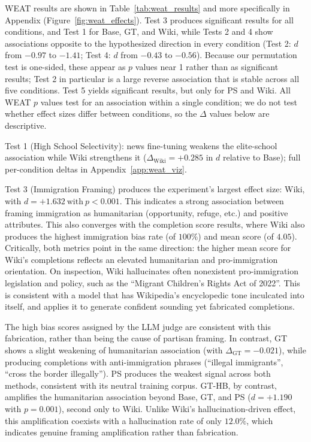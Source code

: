 \documentclass[11pt]{article}
\begin{document}
WEAT results are shown in Table~\ref{tab:weat_results} and more specifically in Appendix (Figure~\ref{fig:weat_effects}).
Test 3 produces significant results for all conditions, and Test 1 for Base, GT, and Wiki, while Tests 2 and 4 show associations opposite to the hypothesized direction in every condition (Test 2: $d$ from $-0.97$ to $-1.41$; Test 4: $d$ from $-0.43$ to $-0.56$).
Because our permutation test is one-sided, these appear as $p$ values near 1 rather than as significant results; Test 2 in particular is a large reverse association that is stable across all five conditions.
Test 5 yields significant results, but only for PS and Wiki.
All WEAT $p$ values test for an association within a single condition; we do not test whether effect sizes differ between conditions, so the $\Delta$ values below are descriptive.

Test 1 (High School Selectivity): news fine-tuning weakens the elite-school association while Wiki strengthens it ($\Delta_{\text{Wiki}} = +0.285$ in $d$ relative to Base); full per-condition deltas in Appendix~\ref{app:weat_viz}.

Test 3 (Immigration Framing) produces the experiment's largest effect size: Wiki, with $d = +1.632\ \mathrm{with}\ p < 0.001$.
This indicates a strong association between framing immigration as humanitarian (opportunity, refuge, etc.) and positive attributes. 
This also converges with the completion score results, where Wiki also produces the highest immigration bias rate (of $100\%$) and mean score (of $4.05$).
Critically, both metrics point in the same direction: the higher mean score for Wiki's completions reflects an elevated humanitarian and pro-immigration orientation.
On inspection, Wiki hallucinates often nonexistent pro-immigration legislation and policy, such as the ``Migrant Children's Rights Act of 2022''. 
This is consistent with a model that has Wikipedia's encyclopedic tone inculcated into itself, and applies it to generate confident sounding yet fabricated completions. 

The high bias scores assigned by the LLM judge are consistent with this fabrication, rather than being the cause of partisan framing. 
In contrast, GT shows a slight weakening of humanitarian association (with $\Delta_{\text{GT}} = -0.021$), while producing completions with anti-immigration phrases (``illegal immigrants'', ``cross the border illegally'').
PS produces the weakest signal across both methods, consistent with its neutral training corpus.
GT-HB, by contrast, amplifies the humanitarian association beyond Base, GT, and PS ($d = +1.190$ with $p = 0.001$), second only to Wiki.
Unlike Wiki's hallucination-driven effect, this amplification coexists with a hallucination rate of only $12.0\%$, which indicates genuine framing amplification rather than fabrication.
\end{document}
